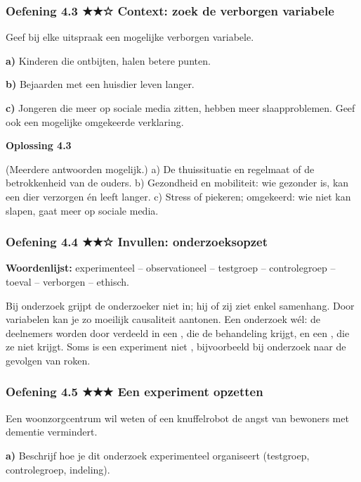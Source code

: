 \subsubsection*{Oefening 4.3 \quad ★★☆ \quad Context: zoek de verborgen variabele}

Geef bij elke uitspraak een mogelijke verborgen variabele.

\textbf{a)} Kinderen die ontbijten, halen betere punten. \lijn

\textbf{b)} Bejaarden met een huisdier leven langer. \lijn

\textbf{c)} Jongeren die meer op sociale media zitten, hebben meer slaapproblemen. Geef ook een mogelijke omgekeerde verklaring. \lijn

\begin{oplossing}
\textbf{Oplossing 4.3}

(Meerdere antwoorden mogelijk.) a) De thuissituatie en regelmaat of de betrokkenheid van de ouders. b) Gezondheid en mobiliteit: wie gezonder is, kan een dier verzorgen én leeft langer. c) Stress of piekeren; omgekeerd: wie niet kan slapen, gaat meer op sociale media.
\end{oplossing}

\subsubsection*{Oefening 4.4 \quad ★★☆ \quad Invullen: onderzoeksopzet}

\textbf{Woordenlijst:} experimenteel – observationeel – testgroep – controlegroep – toeval – verborgen – ethisch.

Bij  onderzoek grijpt de onderzoeker niet in; hij of zij ziet enkel samenhang. Door  variabelen kan je zo moeilijk causaliteit aantonen. Een  onderzoek wél: de deelnemers worden door  verdeeld in een , die de behandeling krijgt, en een , die ze niet krijgt. Soms is een experiment niet , bijvoorbeeld bij onderzoek naar de gevolgen van roken.

\subsubsection*{Oefening 4.5 \quad ★★★ \quad Een experiment opzetten}

Een woonzorgcentrum wil weten of een knuffelrobot de angst van bewoners met dementie vermindert.

\textbf{a)} Beschrijf hoe je dit onderzoek experimenteel organiseert (testgroep, controlegroep, indeling). \lijn

